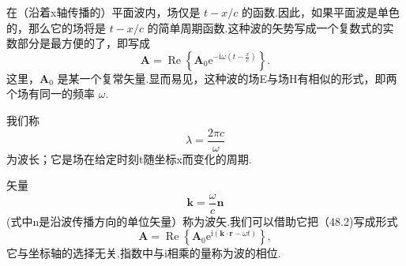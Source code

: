 在（沿着x轴传播的）平面波内，场仅是 $t - x/c$ 的函数.因此，如果平面波是单色的，那么它的场将是 $t - x/c$ 的简单周期函数.这种波的矢势写成一个复数式的实数部分是最方便的了，即写成
\begin{equation}
  \boldsymbol{A}=\operatorname{Re}\left\{\boldsymbol{A}_0
  \mathrm{e}^{-\mathrm{i}\omega\left(t-\frac{x}{c}\right)}\right\}.
\end{equation}
这里，$\boldsymbol{A}_0$ 是某一个复常矢量.显而易见，这种波的场E与场H有相似的形式，即两个场有同一的频率 $\omega$.

我们称
\begin{equation}
  \lambda=\frac{2\pi c}{\omega}
\end{equation}
为波长；它是场在给定时刻t随坐标x而变化的周期.

矢量
\begin{equation}
  \boldsymbol{k}=\frac{\omega}{c}\boldsymbol{n}
\end{equation}
(式中n是沿波传播方向的单位矢量）称为波矢.我们可以借助它把（48.2)写成形式
\begin{equation}
  \boldsymbol{A}=\operatorname{Re}\left\{\boldsymbol{A}_0
  \mathrm{e}^{\mathrm{i}(\boldsymbol{k}\cdot\boldsymbol{r}-\omega t)}\right\},
\end{equation}
它与坐标轴的选择无关.指数中与i相乘的量称为波的相位.

